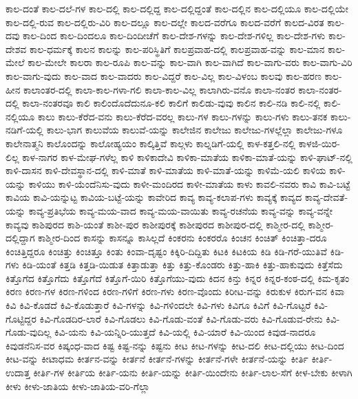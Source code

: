 {ಕಾಲ-ದಂತೆ
ಕಾಲ-ದಲೆ-ಗಳ
ಕಾಲ-ದಲ್ಲಿ
ಕಾಲ-ದಲ್ಲಿದ್ದ
ಕಾಲ-ದಲ್ಲಿದ್ದಂತೆ
ಕಾಲ-ದಲ್ಲಿನ
ಕಾಲ-ದಲ್ಲಿಯೂ
ಕಾಲ-ದಲ್ಲಿಯೇ
ಕಾಲ-ದಲ್ಲಿ-ರುವ
ಕಾಲ-ದಲ್ಲಿರು-ವಿರಿ
ಕಾಲ-ದಲ್ಲೂ
ಕಾಲ-ದಲ್ಲೇ
ಕಾಲದ-ವರೆಗೂ
ಕಾಲದ-ವರೆಗೆ
ಕಾಲದ-ವಿರತ
ಕಾಲ-ದವು
ಕಾಲ-ದಿಂದ
ಕಾಲ-ದಿಂದಲೂ
ಕಾಲ-ದಿಂದೀಚೆಗೆ
ಕಾಲ-ದೇಶ-ಗಳನ್ನು
ಕಾಲ-ದೇಶ-ಗಳಿಲ್ಲ
ಕಾಲ-ದೇಶ-ಗಳು
ಕಾಲ-ದೇಶವ
ಕಾಲ-ಧರ್ಮಕ್ಕೆ
ಕಾಲನ
ಕಾಲನ್ನು
ಕಾಲ-ಪರಿಸ್ಥಿತಿಗೆ
ಕಾಲಪ್ರವಾಹ-ದಲ್ಲಿ
ಕಾಲಪ್ರವಾಹ-ವನ್ನು
ಕಾಲ-ಮಾನ
ಕಾಲ-ಮೇಲೆ
ಕಾಲ-ಮೇಲೇ
ಕಾಲರಾ
ಕಾಲ-ರೂಪಿ
ಕಾಲ-ವನ್ನು
ಕಾಲ-ವಾಗಿ
ಕಾಲ-ವಾಗಿದೆ
ಕಾಲ-ವಾಗು-ವರು
ಕಾಲ-ವಾಗು-ವಿರಿ
ಕಾಲ-ವಾಗು-ವುದು
ಕಾಲ-ವಾದ
ಕಾಲ-ವಾದರು
ಕಾಲ-ವಿದ್ದರೆ
ಕಾಲ-ವಿಲ್ಲ
ಕಾಲ-ವಿಳಂಬ
ಕಾಲವು
ಕಾಲ-ಹರಣ
ಕಾಲ-ಹೀನ
ಕಾಲಾಂತರ-ದಲ್ಲಿ
ಕಾಲಾ-ಕಾಲ-ಗಳಾ-ಗಲಿ
ಕಾಲಾ-ಕಾಲ-ವಿಲ್ಲ
ಕಾಲಾಗಿರು-ವನೊ
ಕಾಲಾ-ನಂತರ
ಕಾಲಾ-ನಂತರ-ದಲ್ಲಿ
ಕಾಲಾ-ನಂತರವೂ
ಕಾಲಿ
ಕಾಲಿಂದೊದೆದುನೂ-ಕಲಿ
ಕಾಲಿಗೆ
ಕಾಲಿಡು-ವುವು
ಕಾಲಿನ
ಕಾಲಿ-ನಡಿ
ಕಾಲಿ-ನಲ್ಲಿ
ಕಾಲಿ-ನಲ್ಲಿಯೂ
ಕಾಲು
ಕಾಲು-ಕೆರೆದ-ವನು
ಕಾಲು-ಕೆರೆದ-ವರಲ್ಲ
ಕಾಲು-ಗಳ
ಕಾಲು-ಗಳನ್ನು
ಕಾಲು-ಗಳು
ಕಾಲು-ತನಕ
ಕಾಲು-ನಡಿಗೆ-ಯಲ್ಲಿ
ಕಾಲು-ಭಾಗ
ಕಾಲುವೆಯ
ಕಾಲುವೆ-ಯನ್ನು
ಕಾಲೇಜಿನ
ಕಾಲೇಜು
ಕಾಲೇಜು-ಗಳಲ್ಲೆಲ್ಲಾ
ಕಾಲೇಜು-ಗಳೂ
ಕಾಲೇನಾತ್ಮನಿ
ಕಾಲೊಂದನ್ನು
ಕಾಲೋಹ್ಯಯಂ
ಕಾಲ್ಕಿತ್ತಿವೆ
ಕಾಲ್ಗಳು
ಕಾಲ್ನಡಿಗೆ-ಯಲ್ಲಿ
ಕಾಳ-ಕತ್ತಲಿ-ನಲ್ಲಿ
ಕಾಳಜಿ-ಯಿರ-ಲಿಲ್ಲ
ಕಾಳ-ನಾಗರ
ಕಾಳ-ಮೇಘ-ಗಳೆಲ್ಲ
ಕಾಳಿ
ಕಾಳಿಕಾದೇವಿ
ಕಾಳಿಕಾ-ಮಾತೆಯ
ಕಾಳಿಕಾ-ಮಾತೆ-ಯನ್ನು
ಕಾಳಿ-ಘಾಟ್-ನಲ್ಲಿ
ಕಾಳಿ-ದಾಸನ
ಕಾಳಿ-ದೇವಸ್ಥಾನ-ದಲ್ಲಿ
ಕಾಳಿ-ಮಾತೆ
ಕಾಳಿ-ಮಾತೆಯ
ಕಾಳಿ-ಮಾತೆ-ಯನ್ನು
ಕಾಳಿಮೆ-ಯಲಿ
ಕಾಳಿಯ
ಕಾಳಿ-ಯನ್ನು
ಕಾಳಿಯು
ಕಾಳಿ-ಯೆಂದೆನಿಸು-ವುದು
ಕಾಳೀ-ಮಂದಿರದ
ಕಾಳೀ-ಮಾತೆಯ
ಕಾಳು
ಕಾವಲಿ-ನವರು
ಕಾವಿ
ಕಾವಿ-ಬಟ್ಟೆ
ಕಾವಿಯ
ಕಾವಿ-ಯನ್ನುಟ್ಟ
ಕಾವಿಯ-ಬಟ್ಟೆ-ಯನ್ನು
ಕಾವೇರಿದ
ಕಾವ್ಯ
ಕಾವ್ಯ-ಕಲಾಪ-ಗಳು
ಕಾವ್ಯಕ್ಕೆ
ಕಾವ್ಯದ
ಕಾವ್ಯ-ದೇವತೆ-ಯನ್ನು
ಕಾವ್ಯ-ಪ್ರತಿಭೆಯ
ಕಾವ್ಯ-ಮಯ-ವಾದ
ಕಾವ್ಯ-ಮಯ-ವಾಯಿತು
ಕಾವ್ಯ-ರಚನೆಯ
ಕಾವ್ಯ-ವನ್ನು
ಕಾವ್ಯ-ವನ್ನೇ
ಕಾವ್ಯವು
ಕಾಶಿಪುರದ
ಕಾಶಿ-ಯಂತೆ
ಕಾಶೀ-ಪುರ
ಕಾಶೀಪುರಕ್ಕೆ
ಕಾಶೀಪುರದ
ಕಾಶೀಪುರ-ದಲ್ಲಿ
ಕಾಶ್ಮೀರ-ದಲ್ಲಿ
ಕಾಶ್ಮೀರ-ದಲ್ಲಿದ್ದಾಗ
ಕಾಶ್ಮೀರ-ದಿಂದ
ಕಾಸನ್ನು
ಕಾಸನ್ನೂ
ಕಾಸಿಲ್ಲದೆ
ಕಿಂಕರನು
ಕಿಂಕರರೊ
ಕಿಂಚನ
ಕಿಂಚಿತ್
ಕಿಂಚಿತ್ತಾ-ದರೂ
ಕಿಂಚಿತ್ತಿದ್ದರೂ
ಕಿಂಚಿತ್ತು
ಕಿಂಚಿತ್ತೂ
ಕಿಂತು
ಕಿಂವಾ-ದೃಷ್ಟಂ
ಕಿಕ್ಕಿರಿ-ದಿದ್ದಿತು
ಕಿಟಕಿ
ಕಿಟಕಿಯ
ಕಿಡಿ
ಕಿಡಿ-ಗರೆ-ಯುತಿವೆ
ಕಿಡಿ-ಗಳು
ಕಿಡಿ-ಯಂತೆ
ಕಿತ್ತಡಿ
ಕಿತ್ತಡಿ-ಯಿಡುತ
ಕಿತ್ತಾಡುತ್ತಾ
ಕಿತ್ತು
ಕಿತ್ತು-ಕೊಂಡರು
ಕಿತ್ತು-ಹಾಕಿ
ಕಿತ್ತು-ಹಾಕುವುದು
ಕಿತ್ತೆಸೆದು
ಕಿತ್ತೊಗೆದ
ಕಿತ್ತೊಗೆದು
ಕಿತ್ತೊಗೆದೆ
ಕಿತ್ತೊಗೆ-ಯಿರಿ
ಕಿತ್ತೊಗೆಯು-ವುದು
ಕಿದನ
ಕಿನ್ತು
ಕಿನ್ನರ
ಕಿನ್ನರ-ಕಂಠ-ದಲ್ಲಿ
ಕಿಮ-ಕೃತಂ
ಕಿರಣ
ಕಿರಣ-ಗಳ
ಕಿರಣ-ಗಳಿಂದ
ಕಿರಣ-ಗಳಿಗೆ
ಕಿರಣ-ಗಳು
ಕಿರಣ-ವೊಂದು
ಕಿರೀಟ-ವನ್ನು
ಕಿರುಕುಳ
ಕಿರುಗ-ವನ
ಕಿವಾ
ಕಿವಿ
ಕಿವಿ-ಕೊಡದೆ
ಕಿವಿ-ಕೊಡುತ್ತಾರೆ
ಕಿವಿ-ಗಳನ್ನು
ಕಿವಿ-ಗಳಿಂದಲೇ
ಕಿವಿ-ಗಳು
ಕಿವಿಗೂ
ಕಿವಿಗೆ
ಕಿವಿ-ಗೊಟ್ಟರೆ
ಕಿವಿ-ಗೊಟ್ಟಿದ್ದರ
ಕಿವಿ-ಗೊಡದಿರ-ಲಾರೆ
ಕಿವಿ-ಗೊಡಲು
ಕಿವಿ-ಗೊಡು-ವಂತೆ
ಕಿವಿ-ಗೊಡು-ವರು
ಕಿವಿ-ಗೊಡುವ-ರೇನು
ಕಿವಿ-ಗೊಡು-ವುದಿಲ್ಲ
ಕಿವಿ-ಯನು
ಕಿವಿ-ಯನ್ನಿರಿ-ಯುತ್ತದೆ
ಕಿವಿ-ಯಲ್ಲಿ
ಕಿವಿ-ಯಾರೆ
ಕಿವಿ-ಯಿಂದ
ಕಿವುಡ-ನಾದರೂ
ಕಿವುಡನೆನಿಸ-ವರ
ಕಿಷ್ಕಂಧ-ವಾದ
ಕಿಷ್ಟ
ಕಿಷ್ಟ-ನನ್ನು
ಕಿಷ್ಟನು
ಕೀಟ
ಕೀಟ-ಗಳನ್ನು
ಕೀಟ-ದಲಿ
ಕೀಟ-ದಲ್ಲಿಯು
ಕೀಟ-ದಿಂದ
ಕೀಟ-ವನ್ನು
ಕೀಟಾಧಮ
ಕೀರ್ತನ-ವನ್ನು
ಕೀರ್ತನೆ
ಕೀರ್ತನೆ-ಗಳನ್ನು
ಕೀರ್ತನೆ-ಗಳೇ
ಕೀರ್ತನೆ-ಯನ್ನು
ಕೀರ್ತಿ
ಕೀರ್ತಿ-ಉದಾತ್ತ
ಕೀರ್ತಿ-ಗಳ
ಕೀರ್ತಿಯ
ಕೀರ್ತಿ-ಯನು
ಕೀರ್ತಿ-ಯನ್ನು
ಕೀರ್ತಿ-ಯಿಂದೇನು
ಕೀರ್ತಿ-ಲಾಲ-ಸೆಗೆ
ಕೀಳ-ಬೇಕು
ಕೀಳಾಗಿ
ಕೀಳು
ಕೀಳು-ಜಾತಿಯ
ಕೀಳು-ಜಾತಿಯ-ವರಿ-ಗೆಲ್ಲಾ
}
